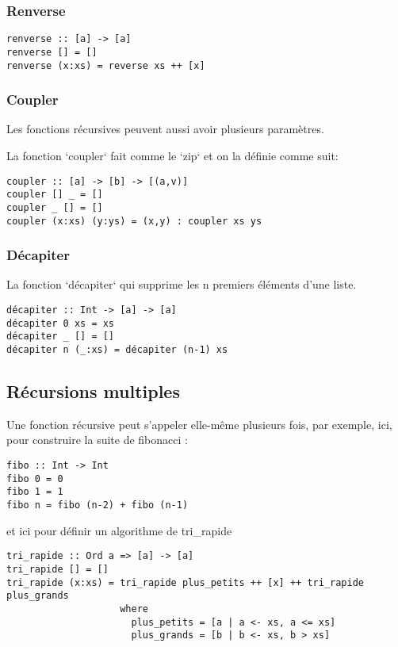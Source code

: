 \documentclass[11pt]{article}
\begin{document}
\subsubsection{Renverse}
\label{sec:orgb9a5e17}
\begin{verbatim}
renverse :: [a] -> [a]
renverse [] = []
renverse (x:xs) = reverse xs ++ [x] 
\end{verbatim}

\subsubsection{Coupler}
\label{sec:orge3e4c53}
Les fonctions récursives peuvent aussi avoir plusieurs paramètres.

La fonction `coupler` fait comme le `zip` et on la définie comme suit:
\begin{verbatim}
coupler :: [a] -> [b] -> [(a,v)]
coupler [] _ = []
coupler _ [] = []
coupler (x:xs) (y:ys) = (x,y) : coupler xs ys
\end{verbatim}
\subsubsection{Décapiter}
\label{sec:orgf2456db}
La fonction `décapiter` qui supprime les n premiers éléments d'une liste.
\begin{verbatim}
décapiter :: Int -> [a] -> [a]
décapiter 0 xs = xs
décapiter _ [] = []
décapiter n (_:xs) = décapiter (n-1) xs
\end{verbatim}

\subsection{Récursions multiples}
\label{sec:org98f376c}

Une fonction récursive peut s'appeler elle-même plusieurs fois,  par exemple, ici,  pour construire la suite de fibonacci : 
\begin{verbatim}
fibo :: Int -> Int
fibo 0 = 0
fibo 1 = 1
fibo n = fibo (n-2) + fibo (n-1)
\end{verbatim}
et ici pour définir un algorithme de tri\_rapide
\begin{verbatim}
tri_rapide :: Ord a => [a] -> [a]
tri_rapide [] = []
tri_rapide (x:xs) = tri_rapide plus_petits ++ [x] ++ tri_rapide plus_grands
                    where 
                      plus_petits = [a | a <- xs, a <= xs]
                      plus_grands = [b | b <- xs, b > xs]
\end{verbatim}
\end{document}
